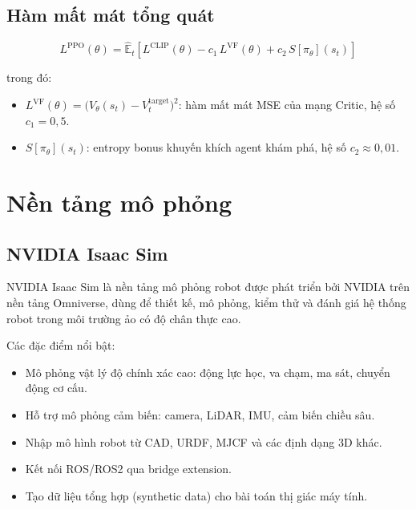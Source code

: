 \subsection{Hàm mất mát tổng quát}

\begin{equation}
    L^{\text{PPO}}(\theta) = \hat{\mathbb{E}}_t\!\left[
        L^{\text{CLIP}}(\theta)
        - c_1\, L^{\text{VF}}(\theta)
        + c_2\, S\!\left[\pi_\theta\right](s_t)
    \right]
    \label{eq:ppo_total_loss}
\end{equation}

trong đó:
\begin{itemize}
    \item $L^{\text{VF}}(\theta) = \bigl(V_\theta(s_t) - V_t^{\text{target}}\bigr)^2$:
    hàm mất mát MSE của mạng Critic, hệ số $c_1 = 0{,}5$.
    \item $S[\pi_\theta](s_t)$: entropy bonus khuyến khích agent khám phá,
    hệ số $c_2 \approx 0{,}01$.
\end{itemize}


\section{Nền tảng mô phỏng}

\subsection{NVIDIA Isaac Sim}

NVIDIA Isaac Sim là nền tảng mô phỏng robot được phát triển bởi NVIDIA trên
nền tảng Omniverse, dùng để thiết kế, mô phỏng, kiểm thử và đánh giá hệ thống
robot trong môi trường ảo có độ chân thực cao.

Các đặc điểm nổi bật:
\begin{itemize}
    \item Mô phỏng vật lý độ chính xác cao: động lực học, va chạm, ma sát,
    chuyển động cơ cấu.
    \item Hỗ trợ mô phỏng cảm biến: camera, LiDAR, IMU, cảm biến chiều sâu.
    \item Nhập mô hình robot từ CAD, URDF, MJCF và các định dạng 3D khác.
    \item Kết nối ROS/ROS2 qua bridge extension.
    \item Tạo dữ liệu tổng hợp (synthetic data) cho bài toán thị giác máy tính.
\end{itemize}

